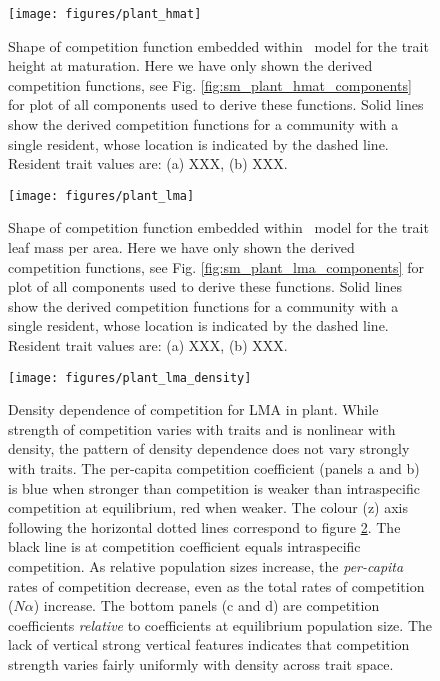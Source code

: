 \documentclass[a4paper,11pt]{article}
\begin{document}
\begin{figure}[h]
  \centering
  \texttt{[image: figures/plant\_hmat]}
  \caption{Shape of competition function embedded within \plant\ model for
  the trait height at maturation.
  Here we have only shown the derived  competition functions, see Fig.
  \ref{fig:sm_plant_hmat_components} for plot of all components used to derive these functions.
  Solid lines show the derived competition functions for a community with a
  single resident, whose location is indicated by the dashed line.
  Resident trait values are: (a) XXX, (b) XXX.}
  \label{fig:plant_hmat}
\end{figure}

\begin{figure}[h]
  \centering
  \texttt{[image: figures/plant\_lma]}
  \caption{Shape of competition function embedded within \plant\ model for
  the trait leaf mass per area.
  Here we have only shown the derived  competition functions, see Fig.
  \ref{fig:sm_plant_lma_components} for plot of all components used to derive these functions.
  Solid lines show the derived competition functions for a community with a
  single resident, whose location is indicated by the dashed line.
  Resident trait values are: (a) XXX, (b) XXX.}
  \label{fig:plant_lma}
\end{figure}

\begin{figure}[h]
  \centering
  \texttt{[image: figures/plant\_lma\_density]}
  \caption{Density dependence of competition for LMA in plant.  While
    strength of competition varies with traits and is nonlinear with
    density, the pattern of density dependence does not vary strongly
    with traits.  The per-capita competition coefficient (panels a and b) is blue when
    stronger than competition is weaker than intraspecific competition
    at equilibrium, red when weaker.  The colour (z) axis following
    the horizontal dotted lines correspond to figure
    \ref{fig:plant_lma}.  The black line is at competition coefficient equals 
    intraspecific competition. As relative population sizes increase, the
    \emph{per-capita} rates of competition decrease, even as the total
    rates of competition ($N \alpha$) increase.  The bottom panels (c
    and d) are competition coefficients \emph{relative} to
    coefficients at equilibrium population size.  The lack of vertical
    strong vertical features indicates that competition strength
    varies fairly uniformly with density across trait space.}
  \label{fig:dd}
\end{figure}
\clearpage
\end{document}
